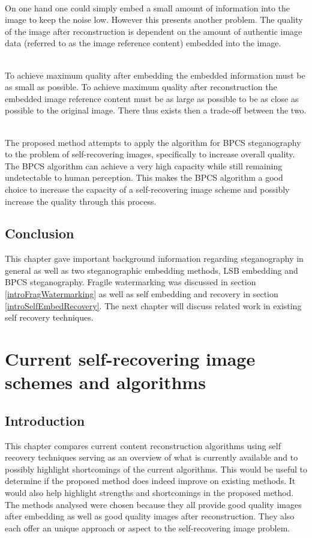 \documentclass[12pt]{article}
\begin{document}
\hspace{0pt} \\
On one hand one could simply embed a small amount of information into the image to keep the noise low.
However this presents another problem.
The quality of the image after reconstruction is dependent on the amount of authentic image data (referred to as the image reference content) embedded into the image.

\hspace{0pt} \\
To achieve maximum quality after embedding the embedded information must be as small as possible.
To achieve maximum quality after reconstruction the embedded image reference content must be as large as possible to be as close as possible to the original image.
There thus exists then a trade-off between the two.

\hspace{0pt} \\
The proposed method attempts to apply the algorithm for BPCS steganography
to the problem of self-recovering images, specifically to increase overall quality.
The BPCS algorithm can achieve a very high capacity while still remaining undetectable to human perception.
This makes the BPCS algorithm a good choice to increase the capacity of a self-recovering image scheme and possibly increase the quality through this process.

\subsection{Conclusion}
\label{introConclusion}
This chapter gave important background information regarding steganography in general as well as two steganographic embedding methods, LSB embedding and BPCS steganography.
Fragile watermarking was discussed in section \ref{introFragWatermarking} as well as self embedding and recovery in section \ref{introSelfEmbedRecovery}.
The next chapter will discuss related work in existing self recovery techniques.

\section{Current self-recovering image schemes and algorithms}
\label{currentSelfRecoveringSchemes}
\subsection{Introduction}
This chapter compares current content reconstruction algorithms using self recovery techniques serving as an overview of what is currently available and to possibly highlight shortcomings of the current algorithms.
This would be useful to determine if the proposed method does indeed improve on existing methods. 
It would also help highlight strengths and shortcomings in the proposed method.
The methods analysed were chosen because they all provide good quality images after embedding as well as good quality images after reconstruction.
They also each offer an unique approach or aspect to the self-recovering image problem.
\end{document}
